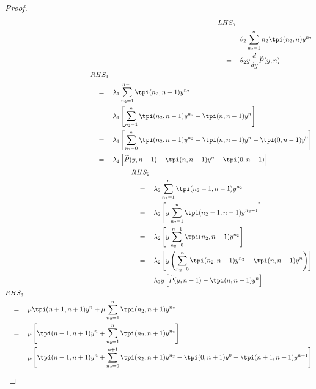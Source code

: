 \begin{proof}
\begin{align}
        \begin{split}
            & LHS_5 \\
            & \quad = \quad \theta_2 \sum_{n_2=1}^{n} n_2 \tpi(n_2,n) y^{n_2} \\
            & \quad = \quad \theta_2 y \frac{d}{dy} \widetilde{P}(y,n)
        \end{split} \\
        \begin{split}
            & RHS_1 \\
            & \quad = \quad \lambda_1 \sum_{n_2=1}^{n-1} \tpi(n_2,n-1) y^{n_2} \\
            & \quad = \quad \lambda_1 \left[ \sum_{n_2=1}^{n} \tpi(n_2,n-1) y^{n_2} - \tpi(n,n-1) y^n \right] \\
            & \quad = \quad \lambda_1 \left[ \sum_{n_2=0}^{n} \tpi(n_2,n-1) y^{n_2} - \tpi(n,n-1) y^n - \tpi(0,n-1) y^0 \right] \\
            & \quad = \quad \lambda_1 \left[ \widetilde{P}(y,n-1) - \tpi(n,n-1) y^n - \tpi(0,n-1) \right]
        \end{split} \\
        \begin{split}
            & RHS_2 \\
            & \quad = \quad \lambda_2 \sum_{n_2=1}^{n} \tpi(n_2-1,n-1) y^{n_2} \\
            & \quad = \quad \lambda_2 \left[ y \sum_{n_2=1}^{n} \tpi(n_2-1,n-1) y^{n_2-1} \right] \\
            & \quad = \quad \lambda_2 \left[ y \sum_{n_2=0}^{n-1} \tpi(n_2,n-1) y^{n_2} \right] \\
            & \quad = \quad \lambda_2 \left[ y \left( \sum_{n_2=0}^{n} \tpi(n_2,n-1) y^{n_2} - \tpi(n,n-1) y^n \right) \right] \\
            & \quad = \quad \lambda_2 y \left[ \widetilde{P}(y,n-1) - \tpi(n,n-1) y^n \right]
        \end{split} \\
        \begin{split}
            & RHS_3 \\
            & \quad = \quad \mu \tpi(n+1,n+1) y^n + \mu \sum_{n_2=1}^{n} \tpi(n_2,n+1) y^{n_2} \\
            & \quad = \quad \mu \left[ \tpi(n+1,n+1) y^n + \sum_{n_2=1}^{n} \tpi(n_2,n+1) y^{n_2} \right] \\
            & \quad = \quad \mu \left[ \tpi(n+1,n+1) y^n + \sum_{n_2=0}^{n+1} \tpi(n_2,n+1) y^{n_2} - \tpi(0,n+1) y^0 - \tpi(n+1,n+1) y^{n+1} \right] \\

\end{split}
\end{align}
\end{proof}
